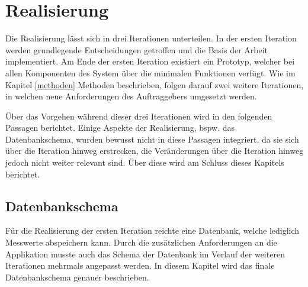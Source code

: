 \chapter{Realisierung}


Die Realisierung lässt sich in drei Iterationen unterteilen.
In der ersten Iteration werden grundlegende Entscheidungen getroffen und die Basis der Arbeit implementiert.
Am Ende der ersten Iteration existiert ein Prototyp,
welcher bei allen Komponenten des System über die minimalen Funktionen verfügt.
Wie im Kapitel \ref{methoden} Methoden beschrieben, folgen darauf zwei weitere Iterationen,
in welchen neue Anforderungen des Auftraggebers umgesetzt werden.

Über das Vorgehen während dieser drei Iterationen wird in den folgenden Passagen berichtet.
Einige Aspekte der Realisierung, bspw. das Datenbankschema,  wurden bewusst nicht in diese Passagen integriert,
da sie sich über die Iteration hinweg erstrecken,
die Veränderungen über die Iteration hinweg jedoch nicht weiter relevant sind.
Über diese wird am Schluss dieses Kapitels berichtet.


\newpage

\newpage

\newpage

\section{Datenbankschema}
\label{rel:db}
Für die Realisierung der ersten Iteration reichte eine Datenbank, welche lediglich Messwerte abspeichern kann.
Durch die zusätzlichen Anforderungen an die Applikation musste auch das Schema der Datenbank
im Verlauf der weiteren Iterationen mehrmals angepasst werden.
In diesem Kapitel wird das finale Datenbankschema genauer beschrieben.





